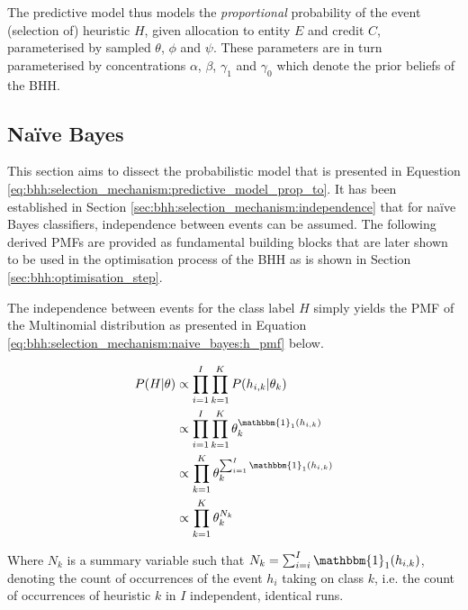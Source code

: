 The predictive model thus models the \textit{proportional} probability of the event (selection of) heuristic $H$, given allocation to entity $E$ and credit $C$, parameterised by sampled $\theta$, $\phi$ and $\psi$. These parameters are in turn parameterised by concentrations $\alpha$, $\beta$, $\gamma_{1}$ and $\gamma_{0}$ which denote the prior beliefs of the \ac{BHH}.


\subsection{Naïve Bayes}
\label{sec:bhh:selection_mechanism:naive_bayes}

This section aims to dissect the probabilistic model that is presented in Equestion \ref{eq:bhh:selection_mechanism:predictive_model_prop_to}. It has been established in Section \ref{sec:bhh:selection_mechanism:independence} that for  naïve Bayes classifiers, independence between events can be assumed. The following derived \acp{PMF} are provided as fundamental building blocks that are later shown to be used in the optimisation process of the \ac{BHH} as is shown in Section \ref{sec:bhh:optimisation_step}.

The independence between events for the class label $H$ simply yields the \ac{PMF} of the Multinomial distribution as presented in Equation \ref{eq:bhh:selection_mechanism:naive_bayes:h_pmf} below.

\begin{equation}
      \label{eq:bhh:selection_mechanism:naive_bayes:h_pmf}
      \begin{split}
            P(H \vert \theta)
            &\propto \prod_{i=1}^{I} \prod_{k=1}^{K} P(h_{i,k} \vert \theta_{k}) \\
            &\propto \prod_{i=1}^{I} \prod_{k=1}^{K} \theta_{k}^{\mathbbm{1}_{1}(h_{i,k})} \\
            &\propto \prod_{k=1}^{K} \theta_{k}^{\sum_{i=1}^{I} \mathbbm{1}_{1}(h_{i,k})} \\
            &\propto \prod_{k=1}^{K} \theta_{k}^{N_{k}}
      \end{split}
\end{equation}

Where $N_{k}$ is a summary variable such that $N_{k} = \sum_{i=i}^{I}
      \mathbbm{1}_{1}(h_{i,k})$, denoting the count of occurrences of the event
$h_{i}$ taking on class $k$, i.e. the count of occurrences of heuristic $k$ in
$I$ independent, identical runs.

